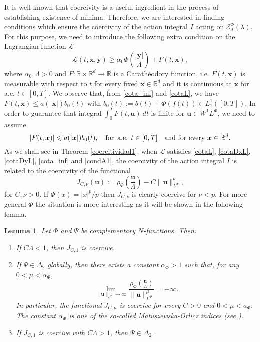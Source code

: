 \documentclass[twoside]{elsarticle}
\newtheorem{lem}[thm]{Lemma}
\theoremstyle{remark}
\newcommand{\orlnor}{\|_{L^{\Phi}}}
\newcommand{\lphi}{L^{\Phi}}
\newcommand{\wphi}{W^{1}\lphi}
\newcommand{\domi}{\mathcal{E}^{\Phi}_d(\lambda)}
\renewcommand{\b}[1]{\boldsymbol{#1}}
\newcommand{\rr}{\mathbb{R}}
\renewcommand{\leq}{\leqslant}
\begin{document}
It is well known that coercivity is a useful ingredient in the process of establishing existence of minima. Therefore, we are interested in finding conditions which ensure the coercivity of the action integral $I$ acting on $\domi$. For this purpose, we need to introduce the following  extra condition on the Lagrangian function $\mathcal{L}$  
\begin{equation}\label{cota_inf}
\mathcal{L}(t,\b{x},\b{y})\geq \alpha_0\Phi\left(\frac{|\b{y}|}{\Lambda}\right)+ F(t,\b{x}),
\end{equation}
where $\alpha_0,\Lambda>0$ and  $F:\rr\times\rr^d\to\rr$ is a Carath\'eodory function, i.e. $F(t,\b{x})$ is  measurable with respect to $t$ for every fixed  $\b{x}\in\rr^d$ and it is continuous at $\b{x}$ for a.e. $t\in [0,T]$. We observe that, from \eqref{cota_inf} and \eqref{cotaL}, we have $F(t,\b{x})\leq a(|\b{x}|)b_0(t)$  with $b_0(t):=b(t)+\Phi(f(t))\in L^1_1([0,T])$. In order to guarantee that integral $\int_0^TF(t,\b{u})\ dt$ is finite for $\b{u}\in\wphi$,  we need to assume 
\begin{equation}\label{condA1} |F(t,\b{x})|\leq a(|\b{x}|)b_0(t),\quad\text{for \,a.e. }t\in [0,T] \quad\text{and for every } \b{x}\in\rr^d.
\end{equation}
As we shall see in Theorem \ref{coercitividad1}, when $\mathcal{L}$ satisfies \eqref{cotaL}, \eqref{cotaDxL}, \eqref{cotaDyL}, \eqref{cota_inf} and \eqref{condA1},  the coercivity of the action integral $I$ is related to the coercivity of the functional
\begin{equation}\label{func_phi}
  J_{C,\nu}(\b{u}):= \rho_{\Phi}\left(\frac{\b{u}}{\Lambda}\right)-C\|\b{u}\orlnor^{\nu},
\end{equation}
for $C,\nu>0$. If $\Phi(x)=|x|^p/p$ then $J_{C,\nu}$ is clearly coercive for $\nu<p$. For more general $\Phi$ the situation is more interesting   as it will be shown in the following lemma.

\begin{lem}\label{lem_coer} Let $\Phi$ and $\Psi$ be complementary $N$-functions. Then:
\begin{enumerate}
  \item If $C\Lambda<1$, then $J_{C,1}$ is coercive. 
  
  \item If $\Psi \in \Delta_2$ globally, then there exists a constant $\alpha_{\Phi}>1$ such that, for any $0<\mu<\alpha_{\Phi}$,
\begin{equation}\label{coer_modular} \lim\limits_{\|\b{u}\orlnor \to \infty} \frac{\rho_{\Phi}\left(\frac{\b{u}}{\Lambda}\right)}{\|\b{u}\orlnor^{\mu}}=+\infty.
\end{equation}
In particular, the functional $J_{C,\mu}$ is coercive for every $C>0$ and  $0<\mu<a_{\Phi}$. The constant $\alpha_{\Phi}$ is one of the so-called \emph{ Matuszewska-Orlicz indices} (see \cite[Ch. 11]{M}).
\item If $J_{C,1}$ is coercive with $C\Lambda>1$, then $\Psi \in \Delta_2$.  
\end{enumerate}
\end{lem}
\end{document}
